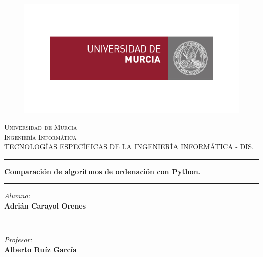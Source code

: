 \begin{titlepage}
		\centering %
		
		\begin{figure}[t]
			\begin{center}
				\includegraphics[scale=0.5]{logo.jpg}
			\end{center}
		\end{figure}
		
		\textsc{\LARGE Universidad de Murcia}\\[1cm] 
		\textsc{\Large Ingeniería Informática}\\[0.5cm] 
		\textsc{\large \uppercase{Tecnologías Específicas de la ingeniería informática - DIS.}}\\[2cm]
		
		\rule{\linewidth}{2mm}
		{ \Huge \textbf {Comparación de algoritmos de ordenación con Python.}}\\ 
		\rule{\linewidth}{2mm}
		
		\vspace{4mm} %
		
		\begin{minipage}{0.45\textwidth}
			\begin{flushleft} %
				\textit{Alumno:}\\
				\textbf{Adrián Carayol Orenes}
			\end{flushleft}
		\end{minipage}
		~ %
		\begin{minipage}{0.45\textwidth}
			\begin{flushright} %
				\textit{Profesor:} \\
				\textbf{Alberto Ruíz García}
			\end{flushright}
		\end{minipage}\\[2cm]
\end{titlepage}